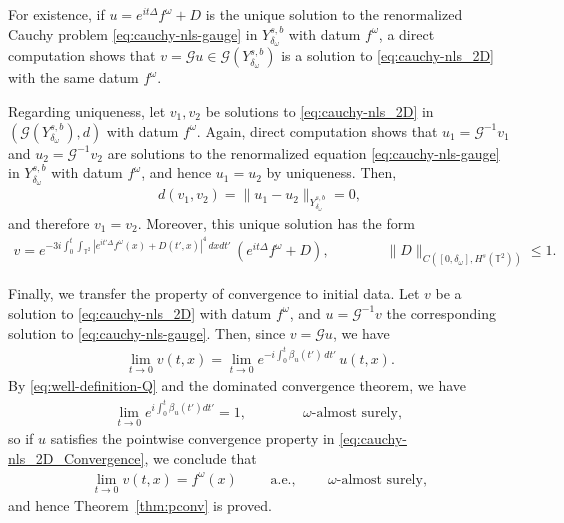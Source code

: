 \documentclass[11pt, xcolor = dvipsnames,reqno
]{amsart}
\theoremstyle{definition}
\theoremstyle{remark}
\begin{document}
For existence, if $u = e^{it\Delta}f^\omega + D$ is the unique solution to the renormalized Cauchy problem \eqref{eq:cauchy-nls-gauge} in $Y^{s,b}_{\delta_{\omega}}$ with datum $f^{\omega}$, a direct computation shows that $v = \mathcal G u \in \mathcal{G}(Y^{s,b}_{\delta_{\omega}})$ is a solution to \eqref{eq:cauchy-nls_2D} with the same datum $f^{\omega}$.

Regarding uniqueness, let $v_1,v_2$ be solutions to \eqref{eq:cauchy-nls_2D} in 
$ (\mathcal{G}(Y^{s,b}_{\delta_{\omega}}),d)$ with datum $f^{\omega}$.
Again, direct computation shows that $u_1 = \mathcal G^{-1}v_1$ and $u_2 = \mathcal G^{-1}v_2$ are solutions to the renormalized equation \eqref{eq:cauchy-nls-gauge} in $Y^{s,b}_{\delta_\omega}$ with datum $f^\omega$, and hence $u_1 = u_2$ by uniqueness.
Then, 
\begin{align}
    d(v_1, v_2) = \lVert u_1 - u_2 \rVert_{Y^{s,b}_{\delta_{\omega}}} = 0, 
\end{align}
and therefore $v_1 = v_2$. 
Moreover, this unique solution has the form 
\begin{align*}
    v = 
    e^{-3 i \int_0^t  \int_{\mathbb T^2} |e^{i t' \Delta} f^\omega(x) + D(t',x)|^4 \, dx dt'} \, 
    (e^{it\Delta} f^{\omega} + D), \qquad \qquad 
    \|D\|_{C([0,\delta_{\omega}] , H^s(\mathbb{T}^2))} \leq 1.
\end{align*}

Finally, we transfer the property of convergence to initial data.
Let $v$ be a solution to \eqref{eq:cauchy-nls_2D} with datum $f^{\omega}$, 
and $u = \mathcal G^{-1} v$ the corresponding solution to \eqref{eq:cauchy-nls-gauge}.
Then, since $v = \mathcal G u$, we have
\begin{align}
    \lim_{t \to 0} v(t,x) = \lim_{t \to 0} e^{-i \int_0^t \beta_u(t')\, dt'} \, u(t,x).
\end{align}
By \eqref{eq:well-definition-Q} and the dominated convergence theorem,  we have
\begin{align}\label{eq:After_DCT}
    \lim_{t \rightarrow 0} e^{i\int_0^t \beta_u(t') dt'} = 1, \qquad \qquad \omega\text{-almost surely, }
\end{align}
so if $u$ satisfies the pointwise convergence property in \eqref{eq:cauchy-nls_2D_Convergence}, we conclude that
\begin{align}\label{eq:Before_DCT}
    \lim_{t \to 0} v(t,x)
    = f^{\omega}(x) \qquad \text{ a.e., }  \qquad \omega\text{-almost surely}, 
\end{align}
and hence Theorem~\ref{thm:pconv} is proved. 
\end{document}
